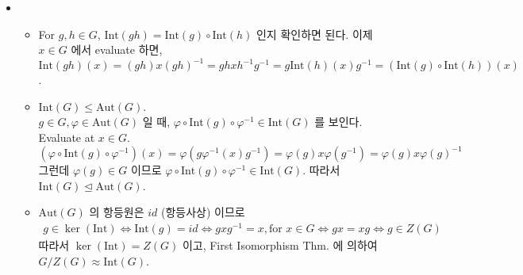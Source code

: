 \documentclass[12pt]{report}
\newcommand{\numl}[1]{\item[\large\textbf{\sffamily #1}]}
\newcommand{\num}[1]{\item[\textbf{\sffamily #1}]}
\newcommand{\nsub}{\mathrel{\unlhd}}
\begin{document}
\begin{itemize}
\numl{12.4.11}
	\begin{itemize}
		\num{(가)} For $g, h\in G$, $\text{Int}(gh) = \text{Int}(g)\circ \text{Int}(h)$ 인지 확인하면 된다. 이제 $x\in G$ 에서 evaluate 하면, $\text{Int}(gh)(x) = (gh)x(gh)^{-1} = ghxh^{-1}g^{-1} = g\text{Int}(h)(x)g^{-1} = (\text{Int}(g)\circ \text{Int}(h))(x)$.
		\num{(나)} $\text{Int}(G) \leq \text{Aut}(G)$.\\
		$g \in G,\varphi \in \text{Aut}(G)$ 일 때, $\varphi \circ\text{Int}(g)\circ \varphi^{-1} \in \text{Int}(G)$ 를 보인다. Evaluate at $x\in G$. $$(\varphi \circ\text{Int}(g)\circ \varphi^{-1}) (x) = \varphi(g \varphi^{-1}(x)g^{-1}) = \varphi(g)x\varphi(g^{-1}) = \varphi(g)x\varphi(g)^{-1}$$ 그런데 $\varphi(g)\in G$ 이므로 $ \varphi \circ\text{Int}(g)\circ \varphi^{-1} \in \text{Int}(G)$. 따라서 $\text{Int}(G) \nsub \text{Aut}(G)$.
		\num{(다)} $\text{Aut}(G)$ 의 항등원은 $id$ (항등사상) 이므로 $$\begin{aligned}
			g \in \ker(\text{Int}) \Leftrightarrow \text{Int}(g)=id \Leftrightarrow gxg^{-1}=x, \text{for } x \in G \Leftrightarrow gx=xg \Leftrightarrow  g\in Z(G)
		\end{aligned}$$
		따라서 $\ker(\text{Int}) = Z(G)$ 이고, First Isomorphism Thm. 에 의하여 $G/Z(G) \approx \text{Int}(G)$.	
	\end{itemize}


\end{itemize}
\end{document}
